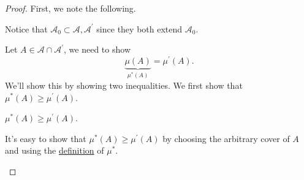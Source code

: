 \begin{proof}
	First, we note the following.
	\begin{note}
		Notice that \(\mathcal{A}_0 \subset \mathcal{A}, \mathcal{A} ^\prime \) since they both extend \(\mathcal{A}_0\).
	\end{note}

	Let \(A\in \mathcal{A} \cap \mathcal{A} ^\prime \), we need to show
	\[
		\underbrace{\mu (A)}_{\mu ^{\ast} (A)} = \mu ^\prime (A).
	\]
	We'll show this by showing two inequalities. We first show that \(\mu ^{\ast} (A)\geq \mu ^\prime (A)\).

	\begin{claim}
		\(\mu ^{\ast} (A)\geq \mu ^\prime (A)\).
	\end{claim}
	\begin{explanation}
		It's easy to show that \(\mu ^{\ast} (A)\geq \mu ^\prime (A)\) by choosing the arbitrary cover of \(A\) and using the \hyperref[prop:outer-measure]{definition}  of
		\(\mu ^{\ast} \).
	\end{explanation}


\end{proof}
